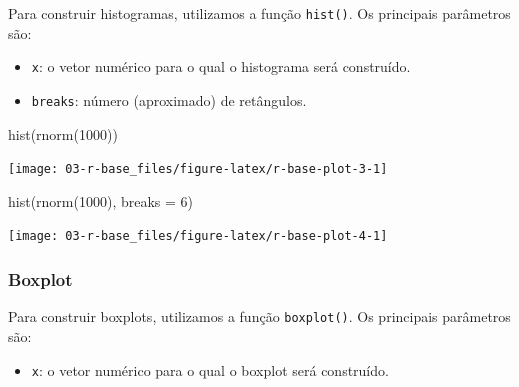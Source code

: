 \documentclass[
]{book}
\newenvironment{Shaded}{\begin{snugshade}}{\end{snugshade}}
\newcommand{\AttributeTok}[1]{\textcolor[rgb]{0.77,0.63,0.00}{#1}}
\newcommand{\DecValTok}[1]{\textcolor[rgb]{0.00,0.00,0.81}{#1}}
\newcommand{\FunctionTok}[1]{\textcolor[rgb]{0.00,0.00,0.00}{#1}}
\newcommand{\NormalTok}[1]{#1}
\newcommand{\SpecialCharTok}[1]{\textcolor[rgb]{0.00,0.00,0.00}{#1}}
\newcommand{\StringTok}[1]{\textcolor[rgb]{0.31,0.60,0.02}{#1}}
\providecommand{\tightlist}{%
  \setlength{\itemsep}{0pt}\setlength{\parskip}{0pt}}
\begin{document}
Para construir histogramas, utilizamos a função \texttt{hist()}. Os principais parâmetros são:

\begin{itemize}
\tightlist
\item
  \texttt{x}: o vetor numérico para o qual o histograma será construído.
\item
  \texttt{breaks}: número (aproximado) de retângulos.
\end{itemize}

\begin{Shaded}
\begin{Highlighting}[]
\FunctionTok{hist}\NormalTok{(}\FunctionTok{rnorm}\NormalTok{(}\DecValTok{1000}\NormalTok{))}
\end{Highlighting}
\end{Shaded}

\begin{center}\texttt{[image: 03-r-base\_files/figure-latex/r-base-plot-3-1]} \end{center}

\begin{Shaded}
\begin{Highlighting}[]
\FunctionTok{hist}\NormalTok{(}\FunctionTok{rnorm}\NormalTok{(}\DecValTok{1000}\NormalTok{), }\AttributeTok{breaks =} \DecValTok{6}\NormalTok{)}
\end{Highlighting}
\end{Shaded}

\begin{center}\texttt{[image: 03-r-base\_files/figure-latex/r-base-plot-4-1]} \end{center}

\hypertarget{boxplot}{%
\subsubsection*{Boxplot}\label{boxplot}}

Para construir boxplots, utilizamos a função \texttt{boxplot()}. Os principais parâmetros são:

\begin{itemize}
\tightlist
\item
  \texttt{x}: o vetor numérico para o qual o boxplot será construído.
\end{itemize}

\begin{Shaded}
\end{Shaded}
\end{document}
